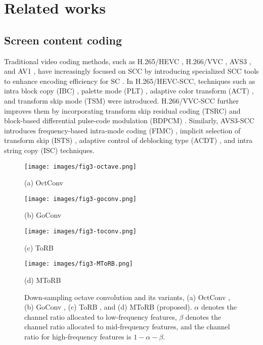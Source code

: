 \section{Related works}
\subsection{Screen content coding}
Traditional video coding methods, such as H.265/HEVC \cite{Lei2017fastintra}, H.266/VVC \cite{bross2021overview}, AVS3 \cite{yin2024afastcu}, and AV1 \cite{Hao2024FastTransform}, have increasingly focused on SCC by introducing specialized SCC tools to enhance encoding efficiency for SC \cite{zhu2017inter-palette,yang2020anovel,zhao2024gcostc}. In H.265/HEVC-SCC, techniques such as intra block copy (IBC) \cite{xu2016intra}, palette mode (PLT) \cite{pu2016palette}, adaptive color transform (ACT) \cite{zhang2016adaptive}, and transform skip mode (TSM) \cite{sole2013ahg8} were introduced. H.266/VVC-SCC \cite{wang2024fastmode} further improves them by incorporating transform skip residual coding (TSRC) and block-based differential pulse-code modulation (BDPCM) \cite{abdoli2019intra}. Similarly, AVS3-SCC introduces frequency-based intra-mode coding (FIMC) \cite{li2019freq}, implicit selection of transform skip (ISTS) \cite{zhang2021implicit}, adaptive control of deblocking type (ACDT) \cite{wang2020deblocking}, and intra string copy (ISC) \cite{zhou2020string} techniques.
\begin{figure}[t]
\centering
\begin{minipage}[b]{0.48\linewidth}
  \centering
  \texttt{[image: images/fig3-octave.png]}
  \centerline{(a) OctConv}\medskip
\end{minipage}
\begin{minipage}[b]{0.48\linewidth}
  \centering
  \texttt{[image: images/fig3-goconv.png]}
  \centerline{(b) GoConv}\medskip
\end{minipage}
\begin{minipage}[b]{\linewidth}
  \centering
  \texttt{[image: images/fig3-toconv.png]}
  \centerline{(c) ToRB}\medskip
\end{minipage}
\begin{minipage}[b]{\linewidth}
  \centering
  \texttt{[image: images/fig3-MToRB.png]}
  \centerline{(d) MToRB}\medskip
\end{minipage}
\caption{Down-sampling octave convolution and its variants, (a) OctConv \cite{chen2019drop}, (b) GoConv \cite{akbari2021learned}, (c) ToRB \cite{chen2022two}, and (d) MToRB (proposed). \({\alpha}\) denotes the channel ratio allocated to low-frequency features, \({\beta}\) denotes the channel ratio allocated to mid-frequency features, and the channel ratio for high-frequency features is \(1 - {\alpha} - {\beta}\).}
\label{fig:octave methods}
\end{figure}
